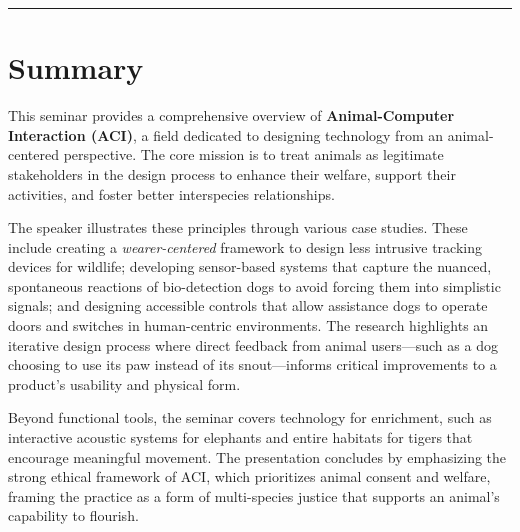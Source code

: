 \documentclass[a4paper,fleqn,11pt]{article}
\begin{document}
\maketitle
\hrule

\section*{\color{RosePineDawnPine}Summary}
\color{CtpMochaCrust}This seminar provides a comprehensive overview of \textbf{Animal-Computer Interaction (ACI)}, a field dedicated to designing technology from an animal-centered perspective. The core mission is to treat animals as legitimate stakeholders in the design process to enhance their welfare, support their activities, and foster better interspecies relationships.

The speaker illustrates these principles through various case studies. These include creating a \textit{wearer-centered} framework to design less intrusive tracking devices for wildlife; developing sensor-based systems that capture the nuanced, spontaneous reactions of bio-detection dogs to avoid forcing them into simplistic signals; and designing accessible controls that allow assistance dogs to operate doors and switches in human-centric environments. The research highlights an iterative design process where direct feedback from animal users—such as a dog choosing to use its paw instead of its snout—informs critical improvements to a product's usability and physical form.

Beyond functional tools, the seminar covers technology for enrichment, such as interactive acoustic systems for elephants and entire habitats for tigers that encourage meaningful movement. The presentation concludes by emphasizing the strong ethical framework of ACI, which prioritizes animal consent and welfare, framing the practice as a form of multi-species justice that supports an animal's capability to flourish.
\end{document}
